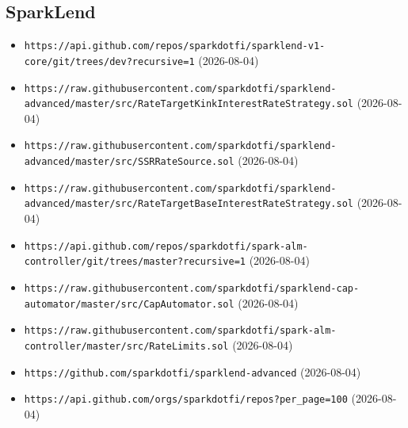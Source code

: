 \subsection*{SparkLend}
\begin{itemize}\setlength{\itemsep}{0pt}\small
\item \texttt{https://api.github.com/repos/sparkdotfi/sparklend-v1-core/git/trees/dev?recursive=1} (2026-08-04)
\item \texttt{https://raw.githubusercontent.com/sparkdotfi/sparklend-advanced/master/src/RateTargetKinkInterestRateStrategy.sol} (2026-08-04)
\item \texttt{https://raw.githubusercontent.com/sparkdotfi/sparklend-advanced/master/src/SSRRateSource.sol} (2026-08-04)
\item \texttt{https://raw.githubusercontent.com/sparkdotfi/sparklend-advanced/master/src/RateTargetBaseInterestRateStrategy.sol} (2026-08-04)
\item \texttt{https://api.github.com/repos/sparkdotfi/spark-alm-controller/git/trees/master?recursive=1} (2026-08-04)
\item \texttt{https://raw.githubusercontent.com/sparkdotfi/sparklend-cap-automator/master/src/CapAutomator.sol} (2026-08-04)
\item \texttt{https://raw.githubusercontent.com/sparkdotfi/spark-alm-controller/master/src/RateLimits.sol} (2026-08-04)
\item \texttt{https://github.com/sparkdotfi/sparklend-advanced} (2026-08-04)
\item \texttt{https://api.github.com/orgs/sparkdotfi/repos?per\_page=100} (2026-08-04)
\end{itemize}

